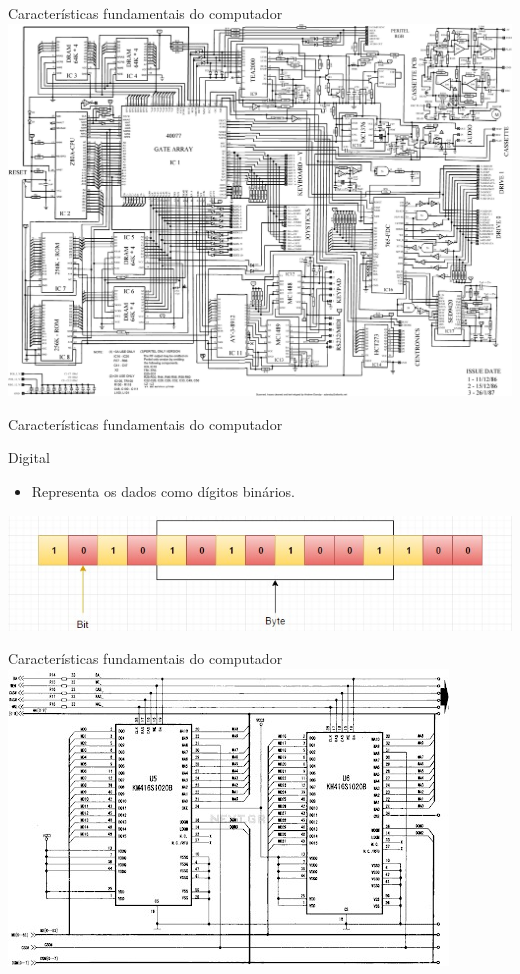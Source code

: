 \begin{frame}{Características fundamentais do computador}
	\centering
	\includegraphics[width=0.85\linewidth]{Figuras/Ch01/fig7}
\end{frame}


\begin{frame}{Características fundamentais do computador}
	\begin{block}{Digital}
		\begin{itemize}
			\item Representa os dados como dígitos binários.
		\end{itemize}
	\end{block}

	\vspace{1cm}

	\centering
	\includegraphics[width=1\linewidth]{Figuras/Ch01/fig9}
\end{frame}


\begin{frame}{Características fundamentais do computador}
	\centering
	\includegraphics[width=0.8\linewidth]{Figuras/Ch01/fig8}
\end{frame}



